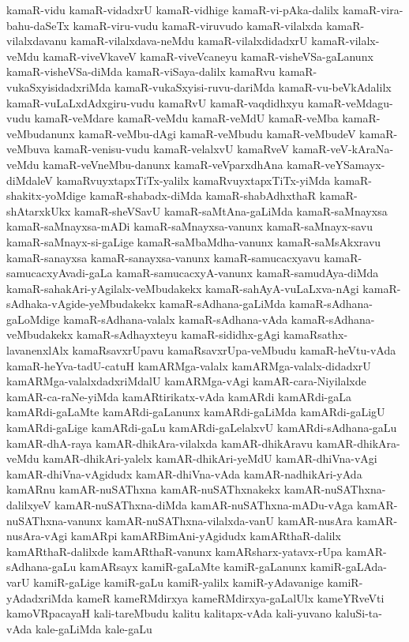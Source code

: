 {kamaR-vidu
kamaR-vidadxrU
kamaR-vidhige
kamaR-vi-pAka-dalilx
kamaR-vira-bahu-daSeTx
kamaR-viru-vudu
kamaR-viruvudo
kamaR-vilalxda
kamaR-vilalxdavanu
kamaR-vilalxdava-neMdu
kamaR-vilalxdidadxrU
kamaR-vilalx-veMdu
kamaR-viveVkaveV
kamaR-viveVcaneyu
kamaR-visheVSa-gaLanunx
kamaR-visheVSa-diMda
kamaR-viSaya-dalilx
kamaRvu
kamaR-vukaSxyisidadxriMda
kamaR-vukaSxyisi-ruvu-dariMda
kamaR-vu-beVkAdalilx
kamaR-vuLaLxdAdxgiru-vudu
kamaRvU
kamaR-vaqdidhxyu
kamaR-veMdagu-vudu
kamaR-veMdare
kamaR-veMdu
kamaR-veMdU
kamaR-veMba
kamaR-veMbudanunx
kamaR-veMbu-dAgi
kamaR-veMbudu
kamaR-veMbudeV
kamaR-veMbuva
kamaR-venisu-vudu
kamaR-velalxvU
kamaRveV
kamaR-veV-kAraNa-veMdu
kamaR-veVneMbu-danunx
kamaR-veVparxdhAna
kamaR-veYSamayx-diMdaleV
kamaRvuyxtapxTiTx-yalilx
kamaRvuyxtapxTiTx-yiMda
kamaR-shakitx-yoMdige
kamaR-shabadx-diMda
kamaR-shabAdhxthaR
kamaR-shAtarxkUkx
kamaR-sheVSavU
kamaR-saMtAna-gaLiMda
kamaR-saMnayxsa
kamaR-saMnayxsa-mADi
kamaR-saMnayxsa-vanunx
kamaR-saMnayx-savu
kamaR-saMnayx-si-gaLige
kamaR-saMbaMdha-vanunx
kamaR-saMsAkxravu
kamaR-sanayxsa
kamaR-sanayxsa-vanunx
kamaR-samucacxyavu
kamaR-samucacxyAvadi-gaLa
kamaR-samucacxyA-vanunx
kamaR-samudAya-diMda
kamaR-sahakAri-yAgilalx-veMbudakekx
kamaR-sahAyA-vuLaLxva-nAgi
kamaR-sAdhaka-vAgide-yeMbudakekx
kamaR-sAdhana-gaLiMda
kamaR-sAdhana-gaLoMdige
kamaR-sAdhana-valalx
kamaR-sAdhana-vAda
kamaR-sAdhana-veMbudakekx
kamaR-sAdhayxteyu
kamaR-sididhx-gAgi
kamaRsathx-lavanenxlAlx
kamaRsavxrUpavu
kamaRsavxrUpa-veMbudu
kamaR-heVtu-vAda
kamaR-heYva-tadU-catuH
kamARMga-valalx
kamARMga-valalx-didadxrU
kamARMga-valalxdadxriMdalU
kamARMga-vAgi
kamAR-cara-Niyilalxde
kamAR-ca-raNe-yiMda
kamARtirikatx-vAda
kamARdi
kamARdi-gaLa
kamARdi-gaLaMte
kamARdi-gaLanunx
kamARdi-gaLiMda
kamARdi-gaLigU
kamARdi-gaLige
kamARdi-gaLu
kamARdi-gaLelalxvU
kamARdi-sAdhana-gaLu
kamAR-dhA-raya
kamAR-dhikAra-vilalxda
kamAR-dhikAravu
kamAR-dhikAra-veMdu
kamAR-dhikAri-yalelx
kamAR-dhikAri-yeMdU
kamAR-dhiVna-vAgi
kamAR-dhiVna-vAgidudx
kamAR-dhiVna-vAda
kamAR-nadhikAri-yAda
kamARnu
kamAR-nuSAThxna
kamAR-nuSAThxnakekx
kamAR-nuSAThxna-dalilxyeV
kamAR-nuSAThxna-diMda
kamAR-nuSAThxna-mADu-vAga
kamAR-nuSAThxna-vanunx
kamAR-nuSAThxna-vilalxda-vanU
kamAR-nusAra
kamAR-nusAra-vAgi
kamARpi
kamARBimAni-yAgidudx
kamARthaR-dalilx
kamARthaR-dalilxde
kamARthaR-vanunx
kamARsharx-yatavx-rUpa
kamAR-sAdhana-gaLu
kamARsayx
kamiR-gaLaMte
kamiR-gaLanunx
kamiR-gaLAda-varU
kamiR-gaLige
kamiR-gaLu
kamiR-yalilx
kamiR-yAdavanige
kamiR-yAdadxriMda
kameR
kameRMdirxya
kameRMdirxya-gaLalUlx
kameYRveVti
kamoVRpacayaH
kali-tareMbudu
kalitu
kalitapx-vAda
kali-yuvano
kaluSi-ta-vAda
kale-gaLiMda
kale-gaLu
}

